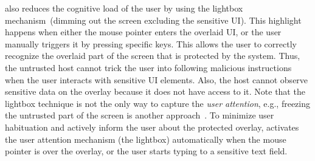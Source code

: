 \name also reduces the cognitive load of the user by using the lightbox mechanism~\cite{huang2012clickjacking}(dimming out the screen excluding the sensitive UI). This highlight happens when either the mouse pointer enters the overlaid UI, or the user manually triggers it by pressing specific keys. This allows the user to correctly recognize the overlaid part of the screen that is protected by the system. Thus, the untrusted host cannot trick the user into following malicious instructions when the user interacts with sensitive UI elements. Also, the host cannot observe sensitive data on the overlay because it does not have access to it. Note that the lightbox technique is not the only way to capture the \emph{user attention}, e.g., freezing the untrusted part of the screen is another approach~\cite{huang2012clickjacking}. 
To minimize user habituation and actively inform the user about the protected overlay, \device activates the user attention mechanism (the lightbox) automatically when the mouse pointer is over the overlay, or the user starts typing to a sensitive text field.





